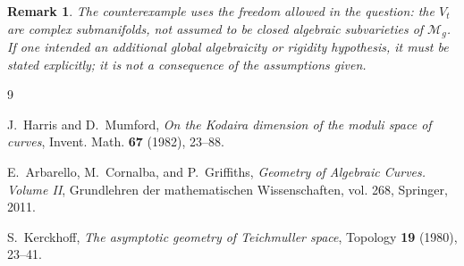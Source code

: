 \documentclass[11pt]{article}
\newtheorem{remark}{Remark}
\begin{document}
\begin{remark}
The counterexample uses the freedom allowed in the question: the \(V_t\) are
complex submanifolds, not assumed to be closed algebraic subvarieties of
\(\mathcal M_g\).  If one intended an additional global algebraicity or rigidity
hypothesis, it must be stated explicitly; it is not a consequence of the
assumptions given.
\end{remark}

\begin{thebibliography}{9}

J.~Harris and D.~Mumford,
\emph{On the Kodaira dimension of the moduli space of curves},
Invent. Math. \textbf{67} (1982), 23--88.

E.~Arbarello, M.~Cornalba, and P.~Griffiths,
\emph{Geometry of Algebraic Curves. Volume II},
Grundlehren der mathematischen Wissenschaften, vol. 268,
Springer, 2011.

S.~Kerckhoff,
\emph{The asymptotic geometry of Teichmuller space},
Topology \textbf{19} (1980), 23--41.

\end{thebibliography}
\end{document}
